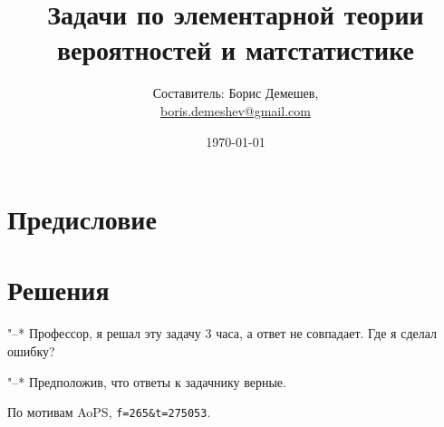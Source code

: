 \documentclass[pdftex,11pt,a4paper]{article}
\title{Задачи по элементарной теории вероятностей и
матстатистике}
\author{Составитель: Борис Демешев, \\
\href{mailto:boris.demeshev@gmail.com}{boris.demeshev@gmail.com} }
\date{\today}
\begin{document}

\maketitle
\tableofcontents{}

\section*{Предисловие} %

\problemonly





\section{Решения}
\solutiononly

"--* Профессор, я решал эту задачу 3 часа, а ответ не совпадает. Где я сделал ошибку?

"--* Предположив, что ответы к задачнику верные.

По мотивам AoPS, \texttt{f=265\&t=275053}.
\par\bigskip







% 

% 



\end{document}
